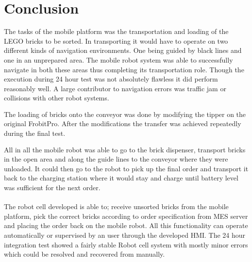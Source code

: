 \chapter{Conclusion}\label{chap:conclusion}
The tasks of the mobile platform was the transportation and loading of the LEGO bricks to be sorted. In transporting it would have to operate on two different kinds of navigation environments. One being guided by black lines and one in an unprepared area. The mobile robot system was able to successfully navigate in both these areas thus completing its transportation role. Though the execution during 24 hour test was not absolutely flawless it did perform reasonably well. A large contributor to navigation errors was traffic jam or collisions with other robot systems. 

The loading of bricks onto the conveyor was done by modifying the tipper on the original FrobitPro. After the modifications the transfer was achieved repeatedly  during the final test. 

All in all the mobile robot was able to go to the brick dispenser, transport bricks in the open area and along the guide lines to the conveyor where they were unloaded. It could then go to the robot to pick up the final order and transport it back to the charging station where it would stay and charge until battery level was sufficient for the next order.
\\
\\
The robot cell developed is able to; receive unsorted bricks from the mobile platform, pick the correct bricks according to order specification from MES server and placing the order back on the mobile robot. All this functionality can operate automatically or supervised by an user through the developed HMI. The 24 hour integration test showed a fairly stable Robot cell system with mostly minor errors which could be resolved and recovered from manually.




